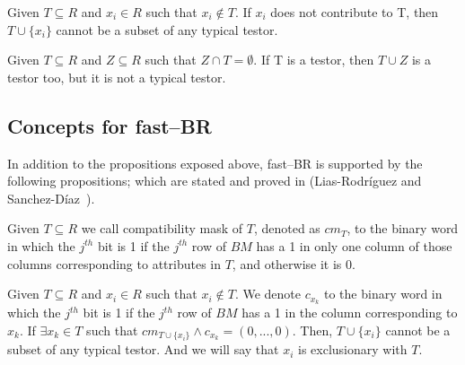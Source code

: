 \documentclass[citeauthoryear]{llncs}
\begin{document}
	\begin{proposition}\label{prop:contrib} 
		Given $T \subseteq R$ and  $x_i \in R$ such that $x_i \notin T$. If $x_i$ does not contribute to T, then 		$T\cup\{x_i\}$ cannot be a subset of any typical testor.
	\end{proposition}

	\begin{proposition}\label{prop:superset} 
		Given $T \subseteq R$ and $Z \subseteq R$ such that $Z \cap T = \emptyset$. If T is a testor, then $T \cup Z$ is a 	testor too, but it is not a typical testor.
	\end{proposition}

%
\subsection{Concepts for fast--BR}
%
	In addition to the propositions exposed above, fast--BR is supported by the following propositions; which are stated and proved in (Lias-Rodr\'iguez and Sanchez-D\'iaz~\cite{Lias2013}).

%	
	
	\begin{definition}\label{def:exclusion}
		Given $T \subseteq R$ we call compatibility mask of $T$, denoted as $cm_T$, to the binary word in which the $j^{\mathit{th}}$ bit is 1 if the $j^{\mathit{th}}$ row of $BM$ has a 1 in only one column of those columns corresponding to attributes in $T$, and otherwise it is 0.
	\end{definition}
	
	\begin{proposition}\label{prop:exclude} 
		Given $T \subseteq R$ and $x_i \in R$ such that $x_i \notin T$.	We denote $c_{x_k}$ to the binary word in which the $j^{\mathit{th}}$ bit is 1 if the $j^{\mathit{th}}$ row of $BM$ has a 1 in the column corresponding to $x_k$. If $\exists x_k \in T$ such that $cm_{T \cup \lbrace x_i\rbrace} \wedge c_{x_k}=(0,...,0)$. Then, $T \cup \lbrace x_i\rbrace$ cannot be a subset of any typical testor. And we will say that $x_i$ is exclusionary with $T$.
	\end{proposition}
	
\end{document}
